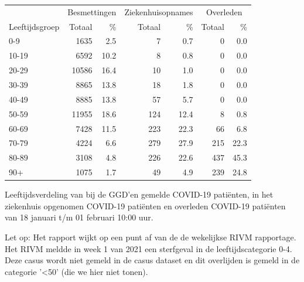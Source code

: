 \documentclass[
  english,
  man,floatsintext]{apa6}
\begin{document}
\begin{table}[H]
\centering\begingroup\fontsize{11}{13}\selectfont

\begin{threeparttable}
\begin{tabular}{lrrrrrr}
\toprule
\multicolumn{1}{c}{ } & \multicolumn{2}{c}{Besmettingen} & \multicolumn{2}{c}{Ziekenhuisopnames} & \multicolumn{2}{c}{Overleden} \\
\cmidrule(l{3pt}r{3pt}){2-3} \cmidrule(l{3pt}r{3pt}){4-5} \cmidrule(l{3pt}r{3pt}){6-7}
Leeftijdsgroep & Totaal & \% & Totaal & \% & Totaal & \%\\
\midrule
0-9 & 1635 & 2.5 & 7 & 0.7 & 0 & 0.0\\
10-19 & 6592 & 10.2 & 8 & 0.8 & 0 & 0.0\\
20-29 & 10586 & 16.4 & 10 & 1.0 & 0 & 0.0\\
30-39 & 8865 & 13.8 & 18 & 1.8 & 0 & 0.0\\
40-49 & 8885 & 13.8 & 57 & 5.7 & 0 & 0.0\\
50-59 & 11955 & 18.6 & 124 & 12.4 & 8 & 0.8\\
60-69 & 7428 & 11.5 & 223 & 22.3 & 66 & 6.8\\
70-79 & 4224 & 6.6 & 279 & 27.9 & 215 & 22.3\\
80-89 & 3108 & 4.8 & 226 & 22.6 & 437 & 45.3\\
90+ & 1075 & 1.7 & 49 & 4.9 & 239 & 24.8\\
\bottomrule
\end{tabular}
\begin{tablenotes}
\item[1] Leeftijdsverdeling van bij de GGD’en gemelde COVID-19 patiënten, in het ziekenhuis opgenomen COVID-19 patiënten en overleden COVID-19 patiënten van 18 januari t/m 01 februari 10:00 uur.
\item[2] Let op: Het rapport wijkt op een punt af van de de wekelijkse RIVM rapportage. Het RIVM meldde in week 1 van 2021 een sterfgeval in de leeftijdscategorie 0-4. Deze casus wordt niet gemeld in de casus dataset en dit overlijden is gemeld in de categorie '<50' (die we hier niet tonen).
\end{tablenotes}
\end{threeparttable}
\endgroup{}
\end{table}

\newpage
\end{document}
